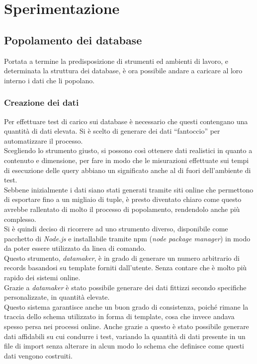 
\chapter{Sperimentazione}
\label{cap:sperimentazione}
\section{Popolamento dei database}

Portata a termine la predisposizione di strumenti ed ambienti di lavoro, e determinata la struttura dei database, è ora possibile andare a caricare al loro interno i dati che li popolano.\\

\subsection{Creazione dei dati}
Per effettuare test di carico sui database è necessario che questi contengano una quantità di dati elevata. Si è scelto di generare dei dati ``fantoccio'' per automatizzare il processo.\\
Scegliendo lo strumento giusto, si possono così ottenere dati realistici in quanto a contenuto e dimensione, per fare in modo che le misurazioni effettuate sui tempi di esecuzione delle query abbiano un significato anche al di fuori dell'ambiente di test.\\
Sebbene inizialmente i dati siano stati generati tramite siti online che permettono di esportare fino a un migliaio di tuple, è presto diventato chiaro come questo avrebbe rallentato di molto il processo di popolamento, rendendolo anche più complesso.\\

\noindent Si è quindi deciso di ricorrere ad uno strumento diverso, disponibile come pacchetto di \textit{Node.js} e installabile tramite \gls{npm} (\textit{node package manager}) in modo da poter essere utilizzato da linea di comando.\\
Questo strumento, \textit{datamaker}\cite{site:datamaker}, è in grado di generare un numero arbitrario di records basandosi su template forniti dall'utente. Senza contare che è molto più rapido dei sistemi online.\\
Grazie a \textit{datamaker} è stato possibile generare dei dati fittizzi secondo specifiche personalizzate, in quantità elevate.\\
Questo sistema garantisce anche un buon grado di consistenza, poiché rimane la traccia dello schema utilizzato in forma di template, cosa che invece andava spesso persa nei processi online. Anche grazie a questo è stato possibile generare dati affidabili su cui condurre i test, variando la quantità di dati presente in un file di import senza alterare in alcun modo lo schema che definisce come questi dati vengono costruiti.\\



